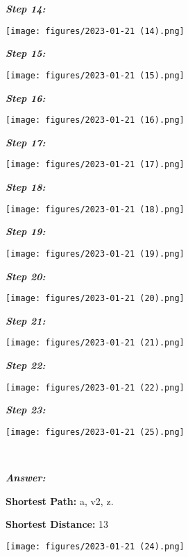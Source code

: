     \textbf{\textit{Step 14:}}\par
    \texttt{[image: figures/2023-01-21 (14).png]}\par
    \textbf{\textit{Step 15:}}\par
    \texttt{[image: figures/2023-01-21 (15).png]}\par
    \textbf{\textit{Step 16:}}\par
    \texttt{[image: figures/2023-01-21 (16).png]}\par
    \textbf{\textit{Step 17:}}\par
    \texttt{[image: figures/2023-01-21 (17).png]}\par
    \textbf{\textit{Step 18:}}\par
    \texttt{[image: figures/2023-01-21 (18).png]}\par
    \textbf{\textit{Step 19:}}\par
    \texttt{[image: figures/2023-01-21 (19).png]}\par
    \textbf{\textit{Step 20:}}\par
    \texttt{[image: figures/2023-01-21 (20).png]}\par
    \textbf{\textit{Step 21:}}\par
    \texttt{[image: figures/2023-01-21 (21).png]}\par
    \textbf{\textit{Step 22:}}\par
    \texttt{[image: figures/2023-01-21 (22).png]}\par
    \textbf{\textit{Step 23:}}\par
    \texttt{[image: figures/2023-01-21 (25).png]}\par
    \ \par
\textbf{\textit{Answer:}}\par
\textbf{Shortest Path: }a, v2, z.\par
\textbf{Shortest Distance: }13\par
\texttt{[image: figures/2023-01-21 (24).png]}


\newpage
